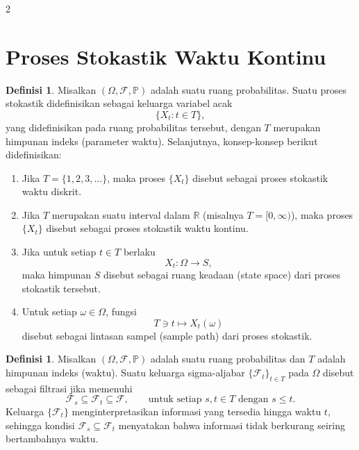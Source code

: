 \documentclass[a4paper,extrafontsizes, 9pt]{memoir}
\theoremstyle{definition}
\newtheorem{definisi}[kalstok]{Definisi}
\theoremstyle{plain}
\theoremstyle{remark}
\begin{document}
\begin{multicols}{2}
  \section{\small Proses Stokastik Waktu Kontinu}

  \begin{definisi}
    Misalkan $(\Omega,\mathcal{F},\mathbb{P})$ adalah suatu ruang probabilitas. Suatu proses
    stokastik didefinisikan sebagai keluarga variabel acak
    \[\{X_t:t\in T\},\]
    yang didefinisikan pada ruang probabilitas tersebut, dengan $T$ merupakan himpunan indeks
    (parameter waktu). Selanjutnya, konsep-konsep berikut didefinisikan:
    \begin{enumerate}[leftmargin=*, itemsep=0.5mm]
      \item Jika $T=\{1,2,3,\ldots\}$, maka proses $\{X_t\}$ disebut sebagai proses stokastik
            waktu diskrit.
      \item Jika $T$ merupakan suatu interval dalam $\mathbb{R}$ (misalnya $T=[0,\infty)$), maka
            proses $\{X_t\}$ disebut sebagai proses stokastik waktu kontinu.
      \item Jika untuk setiap $t\in T$ berlaku
            \[X_t:\Omega\to S,\]
            maka himpunan $S$ disebut sebagai ruang keadaan (state space) dari proses stokastik
            tersebut.
      \item Untuk setiap $\omega\in\Omega$, fungsi
            \[T\ni t\mapsto X_t(\omega)\]
            disebut sebagai lintasan sampel (sample path) dari proses stokastik.
    \end{enumerate}
  \end{definisi}

  \begin{definisi}
    Misalkan $(\Omega,\mathcal{F},\mathbb{P})$ adalah suatu ruang probabilitas dan $T$ adalah
    himpunan indeks (waktu). Suatu keluarga sigma-aljabar $\{\mathcal{F}_t\}_{t\in T}$ pada
    $\Omega$ disebut sebagai filtrasi jika memenuhi
    \[\mathcal{F}_s\subseteq\mathcal{F}_t\subseteq\mathcal{F},\qquad
      \text{untuk setiap }s,t\in T\text{ dengan }s\le t.\]
    Keluarga $\{\mathcal{F}_t\}$ menginterpretasikan informasi yang tersedia hingga waktu $t$,
    sehingga kondisi $\mathcal{F}_s\subseteq\mathcal{F}_t$ menyatakan bahwa informasi tidak
    berkurang seiring bertambahnya waktu.
  \end{definisi}


\end{multicols}
\end{document}
